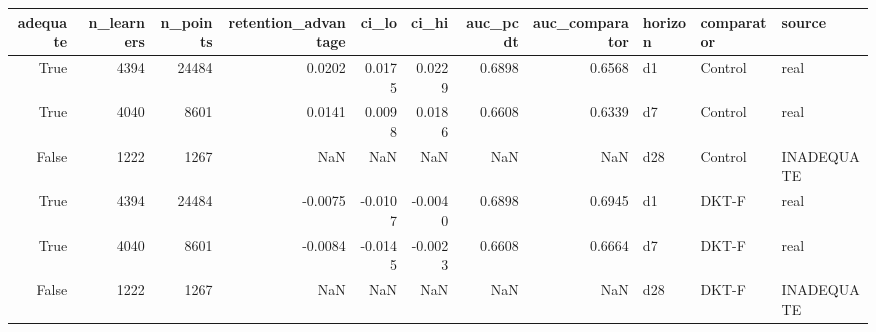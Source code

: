 \begin{tabular}{rrrrrrrrlll}
\toprule
adequate & n\_learners & n\_points & retention\_advantage & ci\_lo & ci\_hi & auc\_pcdt & auc\_comparator & horizon & comparator & source \\
\midrule
True & 4394 & 24484 & 0.0202 & 0.0175 & 0.0229 & 0.6898 & 0.6568 & d1 & Control & real \\
True & 4040 & 8601 & 0.0141 & 0.0098 & 0.0186 & 0.6608 & 0.6339 & d7 & Control & real \\
False & 1222 & 1267 & NaN & NaN & NaN & NaN & NaN & d28 & Control & INADEQUATE \\
True & 4394 & 24484 & -0.0075 & -0.0107 & -0.0040 & 0.6898 & 0.6945 & d1 & DKT-F & real \\
True & 4040 & 8601 & -0.0084 & -0.0145 & -0.0023 & 0.6608 & 0.6664 & d7 & DKT-F & real \\
False & 1222 & 1267 & NaN & NaN & NaN & NaN & NaN & d28 & DKT-F & INADEQUATE \\
\bottomrule
\end{tabular}

